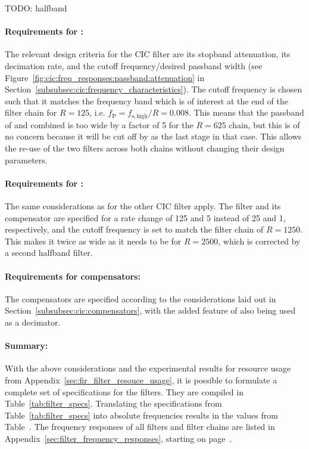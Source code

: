 TODO: halfband

\paragraph{Requirements     for     :} The     relevant     design
criteria    for   the    CIC    filter   are    its   stopband    attenuation,
its   decimation    rate,   and   the   cutoff    frequency/desired   passband
width    (see   Figure~\ref{fig:cic:freq_responses:passband:attenuation}    in
Section~\ref{subsubsec:cic:frequency_characteristics}).  The  cutoff frequency
is chosen such that it matches the  frequency band which is of interest at the
end of the filter chain  for $R=125$, i.e. $f_\mathrm{P} = f_\mathrm{s,high}/R
=  0.008$. This means  that  the passband  of   and  
combined is too wide by a factor of \num{5} for the $R=625$ chain, but this is
of no concern because it will be cut  off by  as the last stage in
that  case. This allows  the  re-use of  the two  filters  across both  chains
without changing their design parameters.

\paragraph{Requirements for :} The same considerations as for the
other CIC  filter apply. The filter  and its  compensator are specified  for a
rate  change  of  \num{125}  and  \num{5} instead  of  \num{25}  and  \num{1},
respectively, and  the cutoff frequency  is set to  match the filter  chain of
$R=1250$. This makes it twice as wide as it needs to be for $R=2500$, which is
corrected by a second halfband filter.

\paragraph{Requirements     for     compensators:} The    compensators     are
specified     according    to     the    considerations     laid    out     in
Section~\ref{subsubsec:cic:compensators},   with   the    added   feature   of
 also being used as a decimator.

\paragraph{Summary:} With  the  above   considerations  and  the  experimental
results for  resource usage  from Appendix~\ref{sec:fir_filter_resouce_usage},
it  is  possible  to  formulate  a complete  set  of  specifications  for  the
filters. They  are  compiled   in  Table~\ref{tab:filter_specs}.   Translating
the   specifications    from   Table~\ref{tab:filter_specs}    into   absolute
frequencies  results  in   the  values  from  Table~\label{tab:tb_widths}. The
frequency    responses    of   all    filters    and    filter   chains    are
listed    in   Appendix~\ref{sec:filter_frequency_responses},    starting   on
page~\pageref{sec:filter_frequency_responses}.

